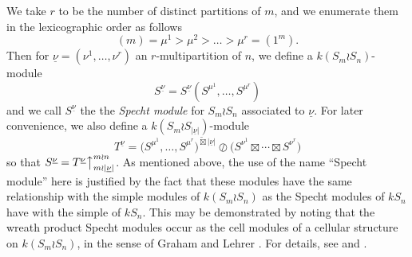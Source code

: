 \documentclass[ALCO,Unicode,published]{cedram}
\newcommand{\ul}[1]{\underline{#1}}
\begin{document}
We take $r$ to be the number of distinct partitions of $m$, and we enumerate them in the lexicographic order as follows
\[ (m) = \mu^1 > \mu^2 > \ldots > \mu^r = (1^m). \]
Then for $\ul{\nu}=(\nu^1,\ldots,\nu^r)$ an $r$-multipartition of $n$, we define a $k(S_m{\wr}S_n)$-module
\[
	S^{\ul{\nu}} =S^{\ul{\nu}}(S^{\mu^1},\ldots,S^{\mu^r})
\]
and we call $S^{\ul{\nu}}$ the the \textit{Specht module} for $S_m{\wr}S_n$ associated to $\ul{\nu}$. For later convenience, we also
define a $k(S_m \wr S_{|\ul{\nu}|})$-module
\[
	T^{\ul{\nu}} = \bigl(S^{\mu^1},\ldots,S^{\mu^r}\bigr)^{\widetilde\boxtimes |\ul{\nu}|}{\oslash}
	\bigl(S^{\nu^1}\boxtimes\cdots\boxtimes S^{\nu^r}\bigr)
\]
so that $S^{\ul{\nu}} = T^{\ul{\nu}}\bigr\uparrow^{m{\wr}n}_{m{\wr}|\ul{\nu}|}$.
As mentioned above, the use of the name ``Specht module'' here is justified by the fact that these modules have the same relationship
with the simple modules of $k(S_m \wr S_n)$ as the Specht modules of $kS_n$ have with the simple of $kS_n$. This may be demonstrated by
noting that the wreath product Specht modules occur as the cell modules of a cellular structure on $k(S_m \wr S_n)$, in the sense of
Graham and Lehrer \cite{GLCA}. For details, see \cite{GCSWPA} and \cite[Section 5.5]{PHDTHES}.
\end{document}

